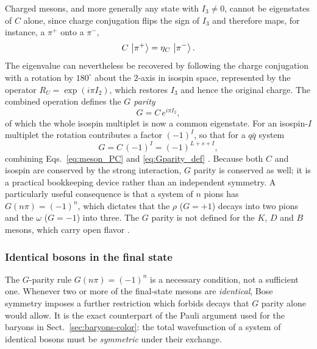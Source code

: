 Charged mesons, and more generally any state with $I_{3} \neq 0$, cannot be eigenstates
of $C$ alone, since charge conjugation flips the sign of $I_{3}$ and therefore maps,
for instance, a $\pi^+$ onto a $\pi^-$,
\begin{equation}
    C\,\ket{\pi^+} = \eta_C\,\ket{\pi^-}.
\end{equation}
The eigenvalue can nevertheless be recovered by following the charge conjugation
with a rotation by $180^\circ$ about the $2$-axis in isospin space, represented by
the operator $R_U = \exp(i\pi I_2)$, which restores $I_{3}$ and hence the original
charge. The combined operation defines the \emph{$G$ parity}
\begin{equation}
    G = C\,e^{i\pi I_2},
    \label{eq:Gparity_def}
\end{equation}
of which the whole isospin multiplet is now a common eigenstate. For an isospin-$I$
multiplet the rotation contributes a factor $(-1)^I$, so that for a $q\bar q$ system
\begin{equation}
    G = C\,(-1)^I = (-1)^{L+s+I},
    \label{eq:Gparity}
\end{equation}
combining Eqs.~\eqref{eq:meson_PC} and \eqref{eq:Gparity_def}
\cite[Ch.~3]{Amsler2018}. Because both $C$ and isospin are conserved by the strong
interaction, $G$ parity is conserved as well; it is a practical bookkeeping device
rather than an independent symmetry. A particularly useful consequence is that a
system of $n$ pions has $G(n\pi) = (-1)^n$, which dictates that the $\rho$ ($G=+1$)
decays into two pions and the $\omega$ ($G=-1$) into three. The $G$ parity is not
defined for the $K$, $D$ and $B$ mesons, which carry open flavor
\cite[Ch.~3]{Amsler2018}.

\subsubsection{Identical bosons in the final state}
\label{subsubsec:bose-symmetry}

The $G$-parity rule $G(n\pi) = (-1)^n$ is a necessary condition, not a sufficient one.
Whenever two or more of the final-state mesons are \emph{identical}, Bose symmetry
imposes a further restriction which forbids decays that $G$ parity alone would allow.
It is the exact counterpart of the Pauli argument used for the baryons in
Sect.~\ref{sec:baryons-color}: the total wavefunction of a system of identical bosons
must be \emph{symmetric} under their exchange.

